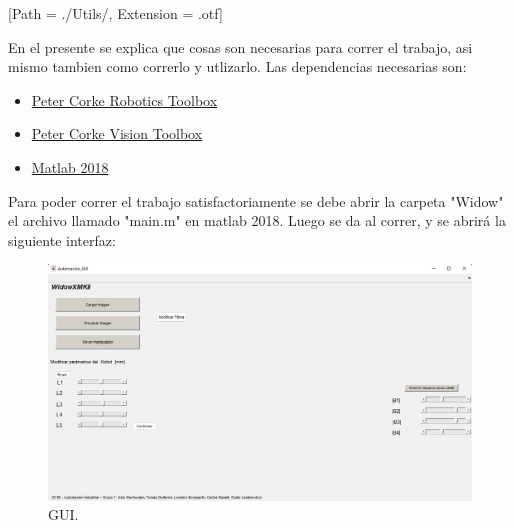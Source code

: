 



\def\verObs{0}


\setmainfont{AvenirLTStd-Roman}[Path = ./Utils/, Extension = .otf]



\setmainfont{Calibri}




En el presente se explica que cosas son necesarias para correr el trabajo, asi mismo tambien como correrlo y utlizarlo.
Las dependencias necesarias son:
\begin{itemize}
\item \href{https://petercorke.com/toolboxes/robotics-toolbox/}{Peter Corke Robotics Toolbox}
\item \href{https://petercorke.com/toolboxes/machine-vision-toolbox/}{Peter Corke Vision Toolbox}
\item \href{https://la.mathworks.com/products/matlab.html}{Matlab 2018}
\end{itemize}
Para poder correr el trabajo satisfactoriamente se debe abrir la carpeta "Widow" el archivo llamado "main.m" en matlab 2018.
Luego se da al correr, y se abrirá la siguiente interfaz:
\begin{figure}[H]
	\centering
	\includegraphics[width=0.8\linewidth]{GUI}
	\caption{GUI.}	
	\label{fig:GUI}
\end{figure}
